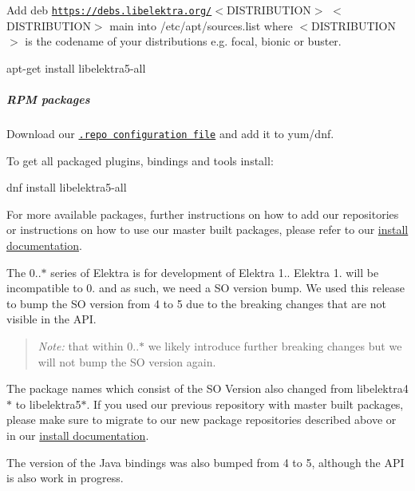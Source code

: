 \begin{DoxyEnumerate}
\item Add {\ttfamily deb \href{https://debs.libelektra.org/}{\tt https\+://debs.\+libelektra.\+org/}$<$D\+I\+S\+T\+R\+I\+B\+U\+T\+I\+ON$>$ $<$D\+I\+S\+T\+R\+I\+B\+U\+T\+I\+ON$>$ main} into {\ttfamily /etc/apt/sources.list} where {\ttfamily $<$D\+I\+S\+T\+R\+I\+B\+U\+T\+I\+ON$>$} is the codename of your distributions e.\+g. {\ttfamily focal}, {\ttfamily bionic} or {\ttfamily buster}.
\end{DoxyEnumerate}


\begin{DoxyCode}
apt-get install libelektra5-all
\end{DoxyCode}


\label{invalid_invalid}%
%
\subparagraph*{R\+PM packages}

Download our \href{https://rpms.libelektra.org/fedora-33/libelektra.repo}{\tt .repo configuration file} and add it to yum/dnf.

To get all packaged plugins, bindings and tools install\+:


\begin{DoxyCode}
dnf install libelektra5-all
\end{DoxyCode}


For more available packages, further instructions on how to add our repositories or instructions on how to use our master built packages, please refer to our \hyperlink{doc_INSTALL_md}{install documentation}.

The 0..$\ast$ series of Elektra is for development of Elektra 1.. Elektra 1. will be incompatible to 0. and as such, we need a SO version bump. We used this release to bump the SO version from 4 to 5 due to the breaking changes that are not visible in the A\+PI.

\begin{quote}
{\itshape Note\+:} that within 0..$\ast$ we likely introduce further breaking changes but we will not bump the SO version again. \end{quote}


The package names which consist of the SO Version also changed from libelektra4$\ast$ to libelektra5$\ast$. If you used our previous repository with master built packages, please make sure to migrate to our new package repositories described above or in our \hyperlink{doc_INSTALL_md}{install documentation}.

The version of the Java bindings was also bumped from 4 to 5, although the A\+PI is also work in progress.


